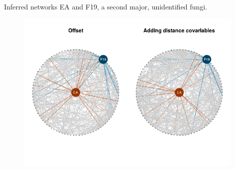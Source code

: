 \documentclass{beamer}
\begin{document}
\begin{frame}{Inferred networks}
EA and F19, a second major, unidentified fungi.
\begin{figure}[htp]
\centering
\includegraphics[width=11cm]{compare_reseaux.png}

\end{figure}

\end{frame}
\end{document}
